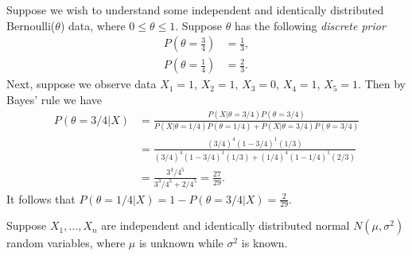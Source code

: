 \begin{exmp}
    Suppose we wish to understand some independent and identically distributed Bernoulli($\theta$) data, where $0 \leq \theta \leq 1$. Suppose $\theta$ has the following \emph{discrete prior}
    \begin{align*}
        P\left(\theta = \frac{3}{4}\right) &= \frac{1}{3}, \\
        P\left(\theta = \frac{1}{4}\right) &= \frac{2}{3}.
    \end{align*}
    Next, suppose we observe data $X_1 = 1$, $X_2 = 1$, $X_3 = 0$, $X_4 = 1$, $X_5 = 1$. Then by Bayes' rule we have
    \begin{align*}
        P\left(\theta = 3/4|X\right) &= \frac{P(X|\theta=3/4)P(\theta=3/4)}{P(X|\theta=1/4)P(\theta=1/4) + P(X|\theta=3/4)P(\theta=3/4)} \\
        &= \frac{\left(3/4\right)^{4}(1-3/4)^{1}(1/3)}{\left(3/4\right)^{4}(1-3/4)^{1}(1/3) + \left(1/4\right)^{4}(1-1/4)^{1}(2/3)} \\
        &= \frac{3^3/4^5}{3^3/4^5 + 2/4^5} = \frac{27}{29}.
    \end{align*}
    It follows that $P(\theta = 1/4|X) = 1-P(\theta=3/4|X) = \frac{2}{29}$.
\end{exmp}

\begin{exmp}
    Suppose $X_1, \ldots, X_n$ are independent and identically distributed normal $N(\mu, \sigma^2)$ random variables, where $\mu$ is unknown while $\sigma^2$ is known.
\end{exmp}
